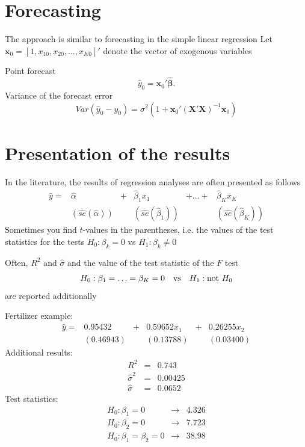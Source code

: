 \documentclass{article}
\begin{document}
\section{Forecasting}

 The approach is similar to forecasting in the simple linear regression
Let $\mathbf{x}_{0}=[1,x_{10},x_{20},\ldots ,x_{K0}]'$ denote
the vector of exogenous variables

Point forecast%
\[\hat{y}_{0}=\mathbf{x}_{0}'\mathbf{\hat{\beta}}.\]
Variance of the forecast error
\begin{equation*}
Var\left( \hat{y}_{0}-y_{0}\right) =\sigma ^{2}\left( 1+\mathbf{x}%
_{0}'\left( \mathbf{X}'\mathbf{X}\right) ^{-1}\mathbf{x}%
_{0}\right)
\end{equation*}

\section{Presentation of the results}

In the literature, the results of regression analyses are often
presented as follows
\begin{equation*}
\begin{array}{cccccc}
\hat{y}= & \hat{\alpha} & + & \hat{\beta}_{1}x_{1} & +\ldots + & \hat{\beta}_{K}x_{K} \\ 
& (\widehat{se}(\hat{\alpha})) &  & (\widehat{se}(\hat{\beta}_{1})) &  & (\widehat{se}(\hat{\beta}_{K}))
\end{array}
\end{equation*}
Sometimes you find $t$-values in the parentheses, i.e. the values of
the test statistics for the tests $H_{0}:\beta _{k}=0$ vs $H_{1}:\beta
_{k}\neq 0$

Often, $R^{2}$ and $\hat{\sigma}$ and the value of the test statistic
of the $F$ test
\begin{equation*}
H_{0}:\beta _{1}=\ldots =\beta _{K}=0\quad \text{vs\quad }H_{1}:\text{not }%
H_{0}
\end{equation*}
are reported additionally

Fertilizer example:
\begin{equation*}
\begin{array}{llllll}
\hat{y}= & 0.95432 & + & 0.59652x_{1} & + & 0.26255x_{2} \\ 
& \!\!(0.46943) &  & \!\!(0.13788) &  & \!\!(0.03400)%
\end{array}%
\end{equation*}
Additional results:
\begin{eqnarray*}
R^{2} &=&0.743 \\
\hat{\sigma}^{2} &=&0.00425 \\
\hat{\sigma} &=&0.0652
\end{eqnarray*}
Test statistics:
\begin{equation*}
\begin{array}{lll}
H_{0}:\beta _{1}=0 & \longrightarrow & 4.326 \\ 
H_{0}:\beta _{2}=0 & \longrightarrow & 7.723 \\ 
H_{0}:\beta _{1}=\beta _{2}=0 & \longrightarrow & 38.98%
\end{array}%
\end{equation*}%
\end{document}
